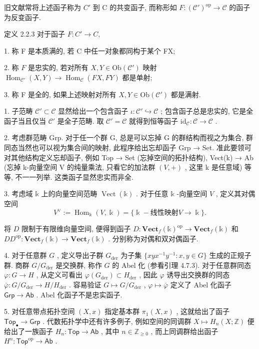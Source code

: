 \documentclass[]{article}
\begin{document}
旧文献常将上述函子称为 $C'$ 到 C 的共变函子, 而称形如 $F : (\mathcal{C}')^{\mathrm{op}} \to \mathcal{C}$ 的函子为反变函子. 

定义 2.2.3 对于函子 $F: C' \rightarrow C,$ 

1. 称 F 是本质满的, 若 C 中任一对象都同构于某个 FX; 

2. 称 $F$ 是忠实的, 若对所有 $X, Y \in \mathrm{Ob}(\mathcal{C}')$ 映射 $\operatorname{Hom}_{\mathcal{C}'}(X, Y) \to \operatorname{Hom}_{\mathcal{C}}(FX, FY)$ 都是单射; 

3. 称 F 是全的, 如果上述映射对所有 $X, Y \in \mathrm{Ob}(\mathcal{C}')$ 都是满射. 

1. 子范畴 $\mathcal{C}' \subset \mathcal{C}$ 显然给出一个包含函子 $\iota: \mathcal{C}' \hookrightarrow \mathcal{C}$ ; 包含函子总是忠实的, 它是全函子当且仅当 $\mathcal{C}'$ 是全子范畴. 取 $\mathcal{C}' = \mathcal{C}$ 就得到恒等函子 $\mathrm{id}_{\mathcal{C}}: \mathcal{C} \to \mathcal{C}$ . 

2. 考虑群范畴 Grp. 对于任一个群 G, 总是可以忘掉 G 的群结构而视之为集合, 群同态当然也可以视为集合间的映射, 此程序给出忘却函子 Grp → Set. 准此要领可对其他结构定义忘却函子, 例如 Top → Set (忘掉空间的拓扑结构), Vect(k) → Ab (忘掉 k-向量空间 V 的纯量乘法, 只看它的加法群 $(V, +)$ , 这里 k 是任意域) 等等, 不一一列举. 这类函子显然忠实而非全. 

3. 考虑域 $\mathbb{k}$ 上的向量空间范畴 $\operatorname{Vect}(\mathbb{k})$ . 对于任意 $\mathbb{k}$ -向量空间 $V$ , 定义其对偶空间 $$
V ^ {\vee} := \operatorname{Hom} _ {\Bbbk} (V, \Bbbk) = \{\Bbbk - \text {线性映射} V \to \Bbbk \}.
$$

将 $D$ 限制于有限维向量空间, 便得到函子 $D: \mathbf{Vect}_f(\mathbb{k})^{\mathrm{op}} \to \mathbf{Vect}_f(\mathbb{k})$ 和 $DD^{\mathrm{op}}: \mathbf{Vect}_f(\mathbb{k}) \to \mathbf{Vect}_f(\mathbb{k})$ . 分别称为对偶和双对偶函子. 

4. 对于任意群 $G$ , 定义导出子群 $G_{\mathrm{der}}$ 为子集 $\{xyx^{-1}y^{-1}: x, y \in G\}$ 生成的正规子群. 商群 $G / G_{\mathrm{der}}$ 是交换群, 称作 $G$ 的 Abel 化 (参看引理 4.7.3). 对于任意群同态 $\varphi: G \to H$ , 从定义可看出 $\varphi(G_{\mathrm{der}}) \subset H_{\mathrm{der}}$ , 因此 $\varphi$ 诱导出交换群的同态 $\bar{\varphi}: G / G_{\mathrm{der}} \to H / H_{\mathrm{der}}$ . 容易验证 $G \mapsto G / G_{\mathrm{der}}$ , $\varphi \mapsto \bar{\varphi}$ 定义了 Abel 化函子 $\mathsf{Grp} \to \mathsf{Ab}$ . Abel 化函子不是忠实函子. 

5. 对任意带点拓扑空间 $(X, x)$ 指定基本群 $\pi_1(X, x)$ , 这就给出了函子 $\mathsf{Top}_{\bullet} \to \mathsf{Grp}$ . 代数拓扑学中还有许多例子, 例如空间的同调群 $X \mapsto H_n(X; \mathbb{Z})$ 便给出了一族函子 $H_n: \mathsf{Top} \to \mathsf{Ab}$ , 其中 $n \in \mathbb{Z}_{\geq 0}$ , 而上同调群给出函子 $H^n: \mathsf{Top}^{\mathrm{op}} \to \mathsf{Ab}$ . 
\end{document}
